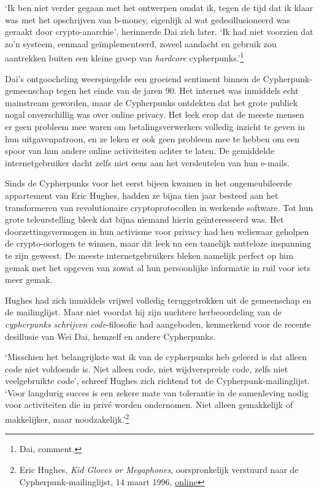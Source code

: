 \documentclass[
  a5paper,
  smalldemyvopaper,11pt,twoside,onecolumn,openright,extrafontsizes,
hidelinks]{memoir}
\begin{document}
`Ik ben niet verder gegaan met het ontwerpen omdat ik, tegen de tijd dat
ik klaar was met het opschrijven van b-money, eigenlijk al wat
gedesillusioneerd was geraakt door crypto-anarchie', herinnerde Dai zich
later. `Ik had niet voorzien dat zo'n systeem, eenmaal geïmplementeerd,
zoveel aandacht en gebruik zou aantrekken buiten een kleine groep van
\emph{hardcore} cypherpunks.'\footnote{Dai, comment.}

Dai's ontgoocheling weerspiegelde een groeiend sentiment binnen de
Cypherpunk-gemeenschap tegen het einde van de jaren 90. Het internet was
inmiddels echt mainstream geworden, maar de Cypherpunks ontdekten dat
het grote publiek nogal onverschillig was over online privacy. Het leek
erop dat de meeste mensen er geen probleem mee waren om
betalingsverwerkers volledig inzicht te geven in hun uitgavenpatroon, en
ze leken er ook geen probleem mee te hebben om een
\hspace{0pt}\hspace{0pt}spoor van hun andere online activiteiten achter
te laten. De gemiddelde internetgebruiker dacht zelfs niet eens aan het
versleutelen van hun e-mails.

Sinds de Cypherpunks voor het eerst bijeen kwamen in het ongemeubileerde
appartement van Eric Hughes, hadden ze bijna tien jaar besteed aan het
transformeren van revolutionaire cryptoprotocollen in werkende software.
Tot hun grote teleurstelling bleek dat bijna niemand hierin
geïnteresseerd was. Het doorzettingsvermogen in hun activisme voor
privacy had hen weliswaar geholpen de crypto-oorlogen te winnen, maar
dit leek nu een tamelijk nutteloze inspanning te zijn geweest. De meeste
internetgebruikers bleken namelijk perfect op hun gemak met het opgeven
van zowat al hun persoonlijke informatie in ruil voor iets meer gemak.

Hughes had zich inmiddels vrijwel volledig teruggetrokken uit de
gemeenschap en de mailinglijst. Maar niet voordat hij zijn nuchtere
herbeoordeling van de \emph{cypherpunks schrijven code}-filosofie had
aangeboden, kenmerkend voor de recente desillusie van Wei Dai, hemzelf
en andere Cypherpunks.

`Misschien het belangrijkste wat ik van de cypherpunks heb geleerd is
dat alleen code niet voldoende is. Niet alleen code, niet wijdverspreide
code, zelfs niet veelgebruikte code', schreef Hughes zich richtend tot
de Cypherpunk-mailinglijst. `Voor langdurig succes is een zekere mate
van tolerantie in de samenleving nodig voor activiteiten die in privé
worden ondernomen. Niet alleen gemakkelijk of makkelijker, maar
noodzakelijk.'\footnote{Eric Hughes, \emph{Kid Gloves or Megaphones},
  oorspronkelijk verstuurd naar de Cypherpunk-mailinglijst, 14 maart
  1996,
  \href{https://cypherpunks.venona.com/date/1996/03/msg00932.html}{online}}
\end{document}
